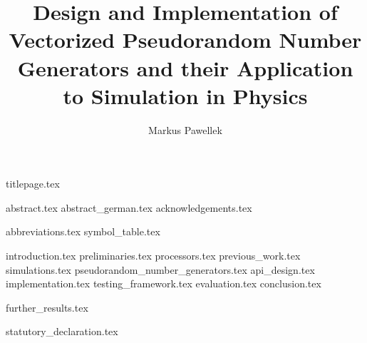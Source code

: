 \documentclass[fleqn,10pt,twoside]{stdglobal}
\title{Design and Implementation of Vectorized Pseudorandom Number Generators and their Application to Simulation in Physics}
\author{Markus Pawellek}
\let\oldpagenumbering\pagenumbering
\renewcommand*\pagenumbering[1]{\cleardoublepage\oldpagenumbering{#1}}
\begin{document}

  {titlepage.tex}

  {abstract.tex}
  \cleardoublepage
  {abstract_german.tex}
  {acknowledgements.tex}

  \tableofcontents
  \listoffigures
  \listoftables
  \listofmath
  {abbreviations.tex}
  {symbol_table.tex}

  {introduction.tex}
  {preliminaries.tex}
  {processors.tex}
  {previous_work.tex}
  {simulations.tex}
  {pseudorandom_number_generators.tex}
  {api_design.tex}
  {implementation.tex}
  {testing_framework.tex}
  {evaluation.tex}
  {conclusion.tex}
  \printbibliography[heading=bibintoc]

  \appendix
  {further_results.tex}

  {statutory_declaration.tex}
\end{document}
